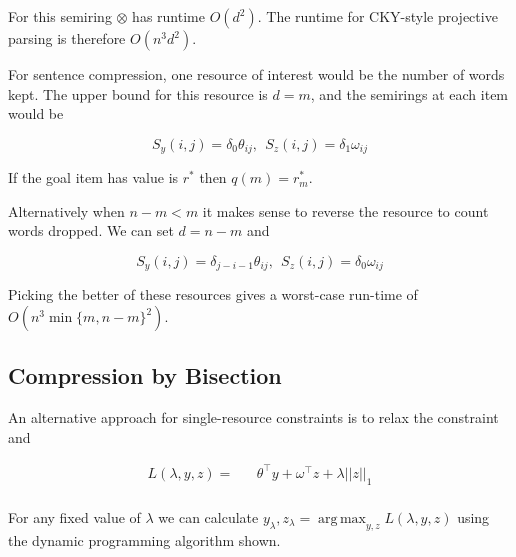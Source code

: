 \documentclass[11pt]{article}
\DeclareMathOperator*{\argmax}{arg\,max}
\newcommand{\rtrap}{\scalebox{0.2}{\tikz{
    \coordinate (A) at (0,0);
    \coordinate (B) at (90:1.5cm);
    \coordinate (C) at (2.5,0.9cm);
    \coordinate (D) at (0:2.5cm);
    \draw[line width = 0.05cm] (A)--(B)--(C)--(D)--cycle;
    }}}
\newcommand{\rtri}{\scalebox{0.2}{\tikz{
    \coordinate (A) at (0,0);
    \coordinate (B) at (90:1.5cm);
    \coordinate (C) at (180:-1.7cm);
    \draw[line width = 0.05cm] (A)--(B)--(C)--cycle;
    }}}
\begin{document}
For this semiring $\otimes$ has runtime $O(d^2)$. The runtime for CKY-style
projective parsing is therefore $O(n^3d^2)$.


For sentence compression, one resource of interest would be the number of 
words kept. The upper bound for this resource is $d=m$, and the semirings 
at each item would be

\[ S_y(i,j) = \delta_0  \theta_{ij} , \ \  S_z(i,j) = \delta_1 \omega_{ij}  \]

If the goal item has value is $r^*$ then $q(m) = r^*_m$.

Alternatively when $n - m < m$ it makes sense to reverse the resource to 
count words dropped. We can set $d = n - m$ and 

\[S_y(i,j) = \delta_{j-i-1}  \theta_{ij} ,\ \   S_z(i,j) = \delta_0 \omega_{ij}    \]

Picking the better of these resources gives a worst-case run-time of $O(n^3\min\{m,n-m\}^2)$. 






\subsection{Compression by Bisection}

An alternative approach for single-resource constraints is to  
relax the constraint and 


\begin{eqnarray*}
  L(\lambda, y, z) = && \theta^\top y +  \omega^\top z + \lambda ||z||_1   \\
\end{eqnarray*}

For any fixed value of $\lambda$ we can calculate $y_\lambda, z_\lambda = \argmax_{y, z} L(\lambda, y, z)$ using the dynamic programming algorithm shown. 
\end{document}
